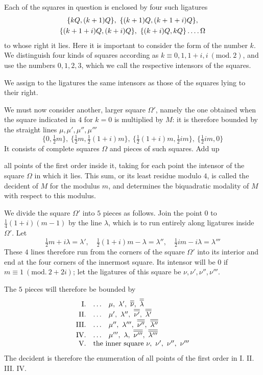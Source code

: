 Each of the squares in question is enclosed by four such ligatures
\[
\begin{gathered}
\{kQ,(k+1)Q\},\ \{(k+1)Q,(k+1+i)Q\},\\
\{(k+1+i)Q,(k+i)Q\},\ \{(k+i)Q,kQ\}\mathinner{.\,.\,.\,.}\Omega
\end{gathered}
\]
to whose right it lies. Here it is important to consider the form of the number $k$. We distinguish four kinds of squares according as $k\equiv0,1,1+i,i\ (\mathrm{mod.}\ 2)$, and use the numbers $0,1,2,3$, which we call the respective intensors of the squares.

We assign to the ligatures the same intensors as those of the squares lying to their right.

We must now consider another, larger square $\Omega'$, namely the one obtained when the square indicated in $4$ for $k=0$ is multiplied by $M$: it is therefore bounded by the straight lines $\mu,\mu',\mu'',\mu'''$
\[
\{0,\tfrac12m\},\ \{\tfrac12m,\tfrac12(1+i)m\},\ \{\tfrac12(1+i)m,\tfrac12im\},\ \{\tfrac12im,0\}
\]
It consists of complete squares $\Omega$ and pieces of such squares. Add up

all points of the first order inside it, taking for each point the intensor of the square $\Omega$ in which it lies. This sum, or its least residue modulo $4$, is called the decident of $M$ for the modulus $m$, and determines the biquadratic modality of $M$ with respect to this modulus.

We divide the square $\Omega'$ into $5$ pieces as follows. Join the point $0$ to $\frac14(1+i)(m-1)$ by the line $\lambda$, which is to run entirely along ligatures inside $\Omega'$. Let
\[
\tfrac12m+i\lambda=\lambda',\quad\tfrac12(1+i)m-\lambda=\lambda'',\quad\tfrac12im-i\lambda=\lambda'''
\]
These $4$ lines therefore run from the corners of the square $\Omega'$ into its interior and end at the four corners of the innermost square. Its intensor will be $0$ if $m\equiv1\ (\mathrm{mod.}\ 2+2i)$; let the ligatures of this square be $\nu,\nu',\nu'',\nu'''$.

The $5$ pieces will therefore be bounded by
\[
\begin{array}{rll}
\mathrm{I}.&\ldots&\mu,\ \lambda',\ \overline{\overline\nu},\ \overline{\overline\lambda}\\
\mathrm{II}.&\ldots&\mu',\ \lambda'',\ \overline{\overline{\nu'}},\ \overline{\overline{\lambda'}}\\
\mathrm{III}.&\ldots&\mu'',\ \lambda''',\ \overline{\overline{\nu''}},\ \overline{\overline{\lambda''}}\\
\mathrm{IV}.&\ldots&\mu''',\ \lambda,\ \overline{\overline{\nu'''}},\ \overline{\overline{\lambda'''}}\\
\mathrm{V}.&\multicolumn{2}{l}{\text{the inner square }\nu,\ \nu',\ \nu'',\ \nu'''}
\end{array}
\]
The decident is therefore the enumeration of all points of the first order in I. II. III. IV.

